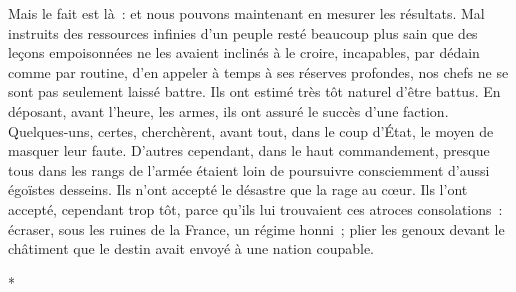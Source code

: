 \documentclass[french,twoside]{book} %
\begin{document}
Mais le fait est là : et nous pouvons maintenant en mesurer les résultats. Mal instruits des ressources infinies d’un peuple resté beaucoup plus sain que des leçons empoisonnées ne les avaient inclinés à le croire, incapables, par dédain comme par routine, d’en appeler à temps à ses réserves profondes, nos chefs ne se sont pas seulement laissé battre. Ils ont estimé très tôt naturel d’être battus. En déposant, avant l’heure, les armes, ils ont assuré le succès d’une faction. Quelques-uns, certes, cherchèrent, avant tout, dans le coup d’État, le moyen de masquer leur faute. D’autres cependant, dans le haut commandement, presque tous dans les rangs de l’armée étaient loin de poursuivre consciemment d’aussi égoïstes desseins. Ils n’ont accepté le désastre que la rage au cœur. Ils l’ont accepté, cependant trop tôt, parce qu’ils lui trouvaient ces atroces consolations : écraser, sous les ruines de la France, un   régime honni ; plier les genoux devant le châtiment que le destin avait envoyé à une nation coupable.\par

\begin{center}
*\par
\end{center}
\end{document}
